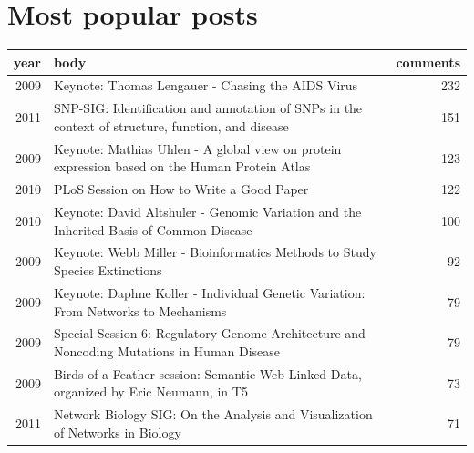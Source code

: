 \documentclass[a4paper,10pt]{article}
\begin{document}
\section{Most popular posts}
\begin{table}[ht]
\begin{center}
{\small
\begin{tabular}{rlr}
  \hline
year & body & comments \\ 
  \hline
2009 & Keynote: Thomas Lengauer - Chasing the AIDS Virus & 232 \\ 
  2011 & SNP-SIG: Identification and annotation of SNPs in the context of structure, function, and disease & 151 \\ 
  2009 & Keynote: Mathias Uhlen - A global view on protein expression based on the Human Protein Atlas & 123 \\ 
  2010 & PLoS Session on How to Write a Good Paper & 122 \\ 
  2010 & Keynote: David Altshuler - Genomic Variation and the Inherited Basis of Common Disease & 100 \\ 
  2009 & Keynote: Webb  Miller - Bioinformatics Methods to Study Species Extinctions & 92 \\ 
  2009 & Keynote: Daphne Koller - Individual Genetic Variation: From Networks to Mechanisms & 79 \\ 
  2009 & Special Session 6: Regulatory Genome Architecture and Noncoding Mutations in Human Disease & 79 \\ 
  2009 & Birds of a Feather session: Semantic Web-Linked Data, organized by Eric Neumann, in T5 & 73 \\ 
  2011 & Network Biology SIG: On the Analysis and Visualization of Networks in Biology & 71 \\ 
   \hline
\end{tabular}
}
\end{center}
\end{table}
\end{document}
